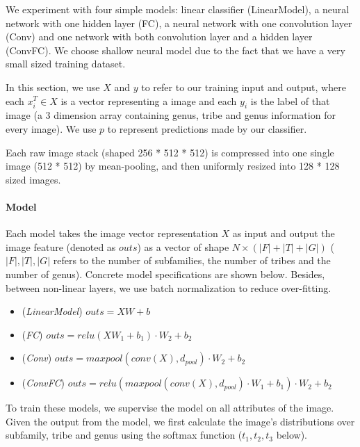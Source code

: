 \documentclass{article}
\begin{document}
We experiment with four simple models: linear classifier (LinearModel), a neural network with one hidden layer (FC), a neural network with one convolution layer (Conv) and one network with both convolution layer and a hidden layer (ConvFC). We choose shallow neural model due to the fact that we have a very small sized training dataset.

In this section, we use ${X}$ and ${y}$ to refer to our training input and output, where each ${x}_i^T\in {X}$ is a vector representing a image and each ${y_i}$ is the label of that image (a 3 dimension array containing genus, tribe and genus information for every image). We use ${p}$ to represent predictions made by our classifier. 

Each raw image stack (shaped 256 * 512 * 512) is compressed into one single image (512 * 512) by mean-pooling, and then uniformly resized into 128 * 128 sized images.

\paragraph{Model}

Each model takes the image vector representation $X$ as input and output the image feature (denoted as $\mathit{outs}$) as a vector of shape $N\times (|F| + |T| + |G|)$ ($|F|, |T|, |G|$ refers to the number of subfamilies, the number of tribes and the number of genus). Concrete model specifications are shown below. Besides, between non-linear layers, we use batch normalization to reduce over-fitting.


\begin{itemize}
	\item (\emph{LinearModel}) $\mathit{outs} = {X} {W} + {b}$
	\item (\emph{FC}) $\mathit{outs} = \mathit{relu}({X} {W}_1 + b_1)\cdot W_2 + b_2$
	\item (\emph{Conv}) $\mathit{outs} = \mathit{maxpool}(\mathit{conv}({X}), d_{\mathit{pool}})\cdot W_2 + b_2$
	\item (\emph{ConvFC}) $\mathit{outs} = \mathit{relu}(\mathit{maxpool}(\mathit{conv}({X}), d_{\mathit{pool}})\cdot W_1 + b_1)\cdot W_2 + b_2$

\end{itemize}

To train these models, we supervise the model on all attributes of the image. Given the output from the model, we first calculate the image's distributions over subfamily, tribe and genus using the softmax function ($t_1, t_2, t_3$ below).
\end{document}
